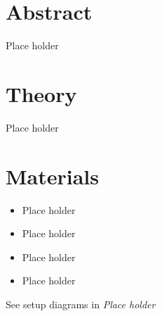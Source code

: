 \documentclass[11pt, letterpaper]{article}
\begin{document}


\section*{Abstract}
\tab
Place holder

\newpage

\tableofcontents
{}
\newpage

\listoffigures
{}
\newpage

\listoftables
{}
\newpage


{}


\section{Theory}
\tab
Place holder


\section{Materials}
	\begin{itemize}
    \item Place holder
    \item Place holder
    \item Place holder
    \item Place holder
	\end{itemize}
See setup diagrams in \textit{Place holder}
\end{document}
